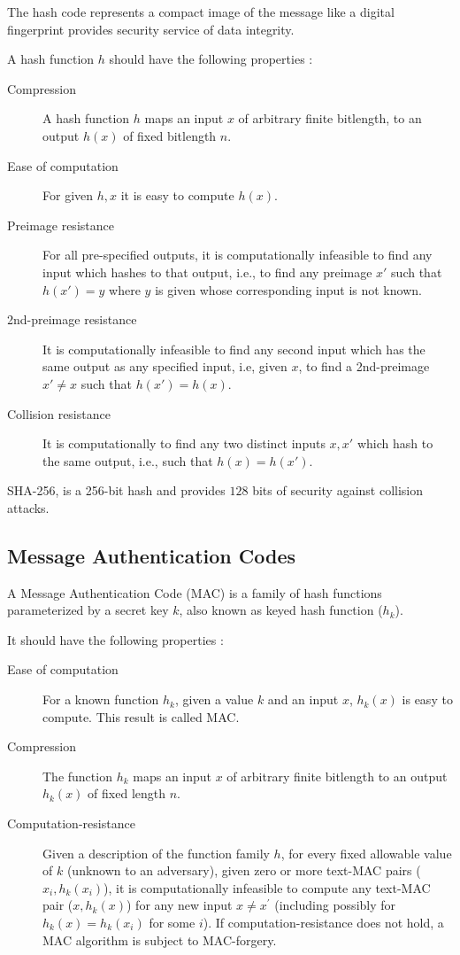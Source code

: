 \documentclass[%
  slidesonly,%
  semlayer%
  ]{seminar}                                  %
\begin{document}
\begin{slide}
    The hash code represents a compact image of the message like a digital fingerprint provides security service of data integrity.

    A hash function $h$ should have the following properties :
    \begin{description}
      \item [Compression] A hash function $h$ maps an input $x$ of arbitrary finite bitlength, to an output $h(x)$ of fixed bitlength $n$.
      \item [Ease of computation] For given $h,x$ it is easy to compute $h(x)$.
      \item [Preimage resistance] For all pre-specified outputs, it is computationally infeasible to find any input which hashes to that output, i.e., to find any preimage $x'$ such that $h(x') = y$ where $y$ is given whose corresponding input is not known.
      \item [2nd-preimage resistance] It is computationally infeasible to find any second input which has the same output as any specified input, i.e, given $x$, to find a 2nd-preimage $x' \neq x$ such that $h(x') = h(x)$.
      \item [Collision resistance] It is computationally to find any two distinct inputs $x,x'$ which hash to the same output, i.e., such that $h(x) = h(x')$.
    \end{description}
    SHA-256, is a 256-bit hash and provides $128$ bits of security against collision attacks.

    \clearpage

  \subsection*{Message Authentication Codes}
    A Message Authentication Code (MAC) is a family of hash functions parameterized by a secret key $k$, also known as keyed hash function ($h_{k}$).

    It should have the following properties :
    \begin{description}
      \item [Ease of computation] For a known function $h_{k}$, given a value $k$
      and an input $x$, $h_{k}(x)$ is easy to compute.
      This result is called MAC.
      \item [Compression] The function $h_{k}$ maps an input $x$ of arbitrary finite bitlength to an output $h_{k}(x)$ of fixed length $n$.  
      \item [Computation-resistance] Given a description of the function family $h$, for every fixed allowable value of $k$ (unknown to an adversary), given zero or more text-MAC pairs ($x_{i}, h_{k}(x_{i})$), it is computationally infeasible to compute any text-MAC pair ($x,h_{k}(x)$) for any new input $x \neq x^{'}$ (including possibly for $h_{k}(x) = h_{k}(x_{i})$ for some $i$). 
      If computation-resistance does not hold, a MAC algorithm is subject to MAC-forgery.
    \end{description}
    \clearpage


\end{slide}
\end{document}
